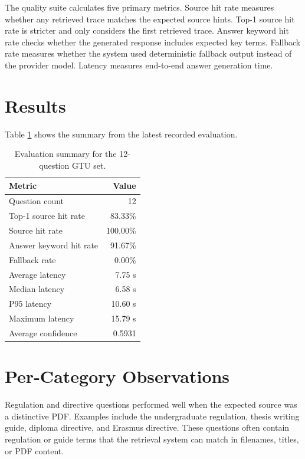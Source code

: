 The quality suite calculates five primary metrics. Source hit rate measures whether any retrieved trace matches the expected source hints. Top-1 source hit rate is stricter and only considers the first retrieved trace. Answer keyword hit rate checks whether the generated response includes expected key terms. Fallback rate measures whether the system used deterministic fallback output instead of the provider model. Latency measures end-to-end answer generation time.

\section{Results}

Table \ref{tab:evaluation-summary} shows the summary from the latest recorded evaluation.

\begin{table}[!htbp]
    \centering
    \caption{\label{tab:evaluation-summary}Evaluation summary for the 12-question GTU set.}
    \begin{tabular}{lr}
        \toprule
        Metric & Value \\
        \midrule
        Question count & 12 \\
        Top-1 source hit rate & 83.33\% \\
        Source hit rate & 100.00\% \\
        Answer keyword hit rate & 91.67\% \\
        Fallback rate & 0.00\% \\
        Average latency & 7.75 s \\
        Median latency & 6.58 s \\
        P95 latency & 10.60 s \\
        Maximum latency & 15.79 s \\
        Average confidence & 0.5931 \\
        \bottomrule
    \end{tabular}
\end{table}

\section{Per-Category Observations}

Regulation and directive questions performed well when the expected source was a distinctive PDF. Examples include the undergraduate regulation, thesis writing guide, diploma directive, and Erasmus directive. These questions often contain regulation or guide terms that the retrieval system can match in filenames, titles, or PDF content.

